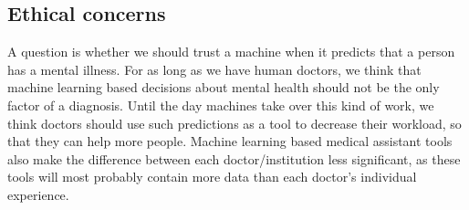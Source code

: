 \subsection{Ethical concerns}
A question is whether we should trust a machine when it predicts that a person has a mental illness. For as long as we have human doctors, we think that machine learning based decisions about mental health should not be the only factor of a diagnosis. Until the day machines take over this kind of work, we think doctors should use such predictions as a tool to decrease their workload, so that they can help more people. Machine learning based medical assistant tools also make the difference between each doctor/institution less significant, as these tools will most probably contain more data than each doctor's individual experience.  